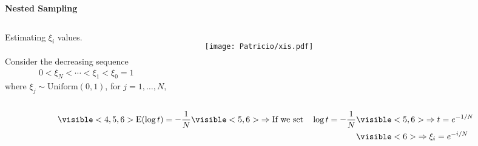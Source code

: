 \begin{frame}{\small{\textbf{Nested Sampling}}}
\begin{columns}[T]
Estimating $\xi_{i}$ values.\\~\\
Consider the decreasing sequence
\begin{align*}
0<\xi_{N}<\cdots<\xi_{1}<\xi_{0}=1
\end{align*}
where $\xi_{j}\sim\text{Uniform}(0,1)$, for $j=1,\ldots,N,$ 
\begin{figure}
   \texttt{[image: Patricio/xis.pdf]}
\end{figure}
\end{columns}
\begin{align*}
\visible<4,5,6>{\text{E}(\log t) = -\frac{1}{N}} 
\visible<5,6>{\Rightarrow \text{If we set}\quad \log t = -\frac{1}{N}}&\visible<5,6>{\Rightarrow t = e^{-1/N}}\\
&\visible<6>{\Rightarrow \xi_{i}= e^{-i/N}}
\end{align*}
\end{frame}
